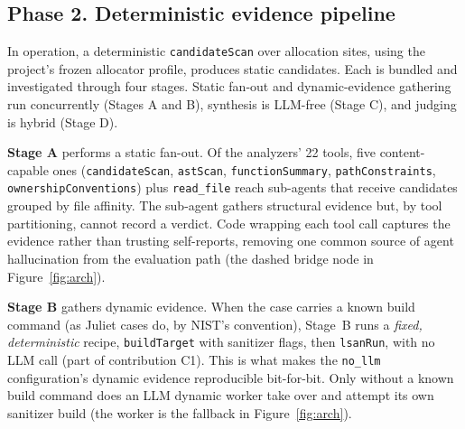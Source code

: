 \documentclass[a4paper]{llncs}
\begin{document}
\begin{table}[htbp]
\centering
\caption{The three POLICY modules and their decisions.}
\label{tab:policy}
\footnotesize
{}
\end{table}

\subsection{Phase 2. Deterministic evidence pipeline}
\label{sec:pipeline}

In operation, a deterministic \texttt{candidateScan} over
allocation sites, using the project's frozen allocator profile,
produces static candidates. Each is
bundled and investigated through four stages. Static fan-out and
dynamic-evidence gathering run concurrently (Stages A and B), synthesis
is LLM-free (Stage C), and judging is hybrid (Stage D).

\textbf{Stage A} performs a static fan-out. Of the analyzers' 22
tools, five content-capable ones (\texttt{candidateScan},
\texttt{astScan}, \texttt{functionSummary}, \texttt{pathConstraints},
\texttt{ownershipConventions}) plus \texttt{read\_file} reach
sub-agents that receive candidates grouped by file affinity. The
sub-agent gathers structural evidence but, by
tool partitioning, cannot record a verdict. Code wrapping each tool
call captures the evidence rather than trusting self-reports, removing
one common source of agent hallucination from the
evaluation path (the dashed bridge node in Figure~\ref{fig:arch}).

\textbf{Stage B} gathers dynamic evidence. When the case carries a known
build command (as Juliet cases do, by NIST's convention), Stage~B runs
a \emph{fixed, deterministic} recipe, \texttt{buildTarget} with
sanitizer flags, then \texttt{lsanRun}, with no LLM call (part of
contribution C1). This is what makes the
\texttt{no\_llm} configuration's dynamic evidence reproducible
bit-for-bit. Only without a known build command does an LLM dynamic
worker take over and attempt its own sanitizer build (the worker is the
fallback in Figure~\ref{fig:arch}).
\end{document}
